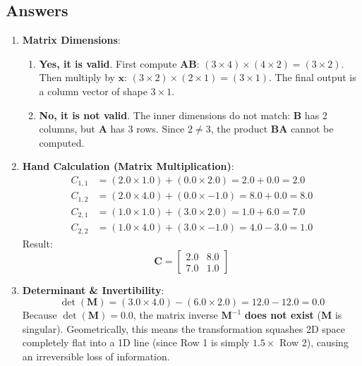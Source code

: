 \subsection*{Answers}

\begin{enumerate}
    \item \textbf{Matrix Dimensions}:
    \begin{enumerate}
        \item \textbf{Yes, it is valid}. First compute $\mathbf{A}\mathbf{B}$: $(3 \times 4) \times (4 \times 2) = (3 \times 2)$. Then multiply by $\mathbf{x}$: $(3 \times 2) \times (2 \times 1) = (3 \times 1)$. The final output is a column vector of shape \textbf{$3 \times 1$}.
        \item \textbf{No, it is not valid}. The inner dimensions do not match: $\mathbf{B}$ has 2 columns, but $\mathbf{A}$ has 3 rows. Since $2 \ne 3$, the product $\mathbf{B}\mathbf{A}$ cannot be computed.
    \end{enumerate}

    \item \textbf{Hand Calculation (Matrix Multiplication)}:
    \begin{align*}
    C_{1,1} &= (2.0 \times 1.0) + (0.0 \times 2.0) = 2.0 + 0.0 = 2.0 \\
    C_{1,2} &= (2.0 \times 4.0) + (0.0 \times -1.0) = 8.0 + 0.0 = 8.0 \\
    C_{2,1} &= (1.0 \times 1.0) + (3.0 \times 2.0) = 1.0 + 6.0 = 7.0 \\
    C_{2,2} &= (1.0 \times 4.0) + (3.0 \times -1.0) = 4.0 - 3.0 = 1.0
    \end{align*}
    Result:
    \begin{equation*}
    \mathbf{C} = \begin{bmatrix} 2.0 & 8.0 \\ 7.0 & 1.0 \end{bmatrix}
    \end{equation*}

    \item \textbf{Determinant \& Invertibility}:
    \begin{equation*}
    \det(\mathbf{M}) = (3.0 \times 4.0) - (6.0 \times 2.0) = 12.0 - 12.0 = 0.0
    \end{equation*}
    Because $\det(\mathbf{M}) = 0.0$, the matrix inverse $\mathbf{M}^{-1}$ \textbf{does not exist} ($\mathbf{M}$ is singular). Geometrically, this means the transformation squashes 2D space completely flat into a 1D line (since Row 1 is simply $1.5 \times$ Row 2), causing an irreversible loss of information.


\end{enumerate}
